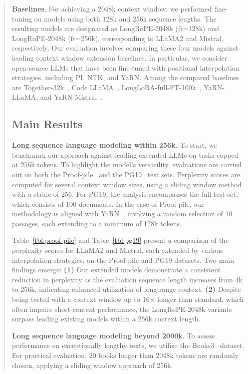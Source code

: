 \begin{abstract}
\textbf{Baselines}. For achieving a 2048k context window, we performed fine-tuning on models using both 128k and 256k sequence lengths. The resulting models are designated as LongRoPE-2048k (ft=128k) and LongRoPE-2048k (ft=256k), corresponding to LLaMA2 and Mistral, respectively. Our evaluation involves comparing these four models against leading context window extension baselines. In particular, we consider open-source LLMs that have been fine-tuned with positional interpolation strategies, including PI, NTK, and YaRN. Among the compared baselines are Together-32k~\cite{together}, Code LLaMA~\cite{codellama}, LongLoRA-full-FT-100k~\cite{longlora}, YaRN-LLaMA, and YaRN-Mistral~\cite{yarn}.

\subsection{Main Results}

\label{sec:mainresult}
\textbf{Long sequence language modeling within 256k}. To start, we benchmark our approach against leading extended LLMs on tasks capped at 256k tokens. To highlight the model's versatility, evaluations are carried out on both the Proof-pile~\cite{pg19} and the PG19~\cite{pile} test sets. Perplexity scores are computed for several context window sizes, using a sliding window method with a stride of 256. For PG19, the analysis encompasses the full test set, which consists of 100 documents. In the case of Proof-pile, our methodology is aligned with YaRN~\cite{yarn}, involving a random selection of 10 passages, each extending to a minimum of 128k tokens.

Table~\ref{tbl:proof-pile} and Table~\ref{tbl:pg19} present a comparison of the perplexity scores for LLaMA2 and Mistral, each extended by various interpolation strategies, on the Proof-pile and PG19 datasets. Two main findings emerge: \textbf{(1)} Our extended models demonstrate a consistent reduction in perplexity as the evaluation sequence length increases from 4k to 256k, indicating enhanced utilization of long-range context. \textbf{(2)} Despite being tested with a context window up to 16$\times$ longer than standard, which often impairs short-context performance, the LongRoPE-2048k variants surpass leading existing models within a 256k context length.

\textbf{Long sequence language modeling beyond 2000k}. To assess performance on exceptionally lengthy texts, we utilize the Books3~\cite{pile} dataset. For practical evaluation, 20 books longer than 2048k tokens are randomly chosen, applying a sliding window approach of 256k.


\end{abstract}
